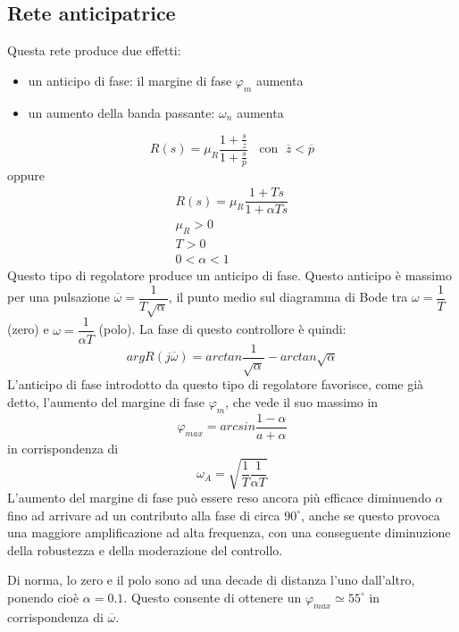 \documentclass[a4paper]{report}
\begin{document}
\subsection{Rete anticipatrice}
Questa rete produce due effetti:
\begin{itemize}
\item un anticipo di fase: il margine di fase $\varphi_m$ aumenta
\item un aumento della banda passante: $\omega_n$ aumenta
\end{itemize}
\begin{equation}
  R(s) = \mu_R \dfrac{1 + \frac{s}{\overline{z}}}{1 +
    \frac{s}{\overline{p}}} \;\; \textrm{ con }\; \overline{z} < \overline{p}
\end{equation}
oppure
\begin{equation}
  \begin{array}{l}
    R(s) = \mu_R \dfrac{1 + Ts}{1 + \alpha Ts}\\
    \mu_R > 0\\
    T > 0\\
    0 < \alpha < 1
  \end{array}
\end{equation}
Questo tipo di regolatore produce un anticipo di fase. Questo anticipo
\`e massimo per una pulsazione $\overline{\omega} = \dfrac{1}{T
  \sqrt{\alpha}}$, il punto medio sul diagramma di Bode tra $\omega =
\dfrac{1}{T}$ (zero) e $\omega = \dfrac{1}{\alpha T}$ (polo).
La fase di questo controllore \`e quindi:
\begin{equation}
  arg R(j \overline{\omega}) = arctan \dfrac{1}{\sqrt{\alpha}} -
  arctan \sqrt{\alpha}
\end{equation}
L'anticipo di fase introdotto da questo tipo di regolatore favorisce,
come gi\`a detto, l'aumento del margine di fase $\varphi_m$, che vede
il suo massimo in
\[
\varphi_{max} = arcsin \dfrac{1 - \alpha}{a + \alpha}
\]
in corrispondenza di
\[
\omega_A = \sqrt{\dfrac{1}{T} \dfrac{1}{\alpha T}}
\]
L'aumento del margine di fase pu\`o essere
reso ancora pi\`u efficace diminuendo $\alpha$ fino ad arrivare ad un
contributo alla fase di circa $90^{\circ}$, anche se questo provoca
una maggiore amplificazione ad alta frequenza, con una conseguente
diminuzione della robustezza e della moderazione del controllo.

Di norma, lo zero e il polo sono ad una decade di distanza l'uno
dall'altro, ponendo cio\`e $\alpha = 0.1$. Questo consente di ottenere
un $\varphi_{max} \simeq 55^{\circ}$ in corrispondenza di
$\overline{\omega}$.
\end{document}
